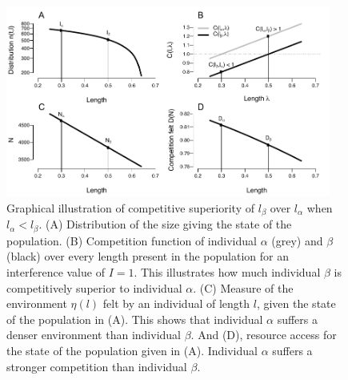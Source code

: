 \begin{figure}[!h] %
\centering
\includegraphics[width=0.95\textwidth]{4_ChapThe1/Fig/FigSM12} 
\caption[Graphical illustration of competitive superiority of $l_{\beta}$ over
$l_{\alpha}$ when $l_{\alpha}<l_{\beta}$]{
Graphical illustration of competitive superiority of $l_{\beta}$ over
$l_{\alpha}$ when $l_{\alpha}<l_{\beta}$.
(A) Distribution of the size giving the state of the population. (B) Competition
function of individual $\alpha$ (grey) and $\beta$ (black) over every length
present in the population for an interference value of $I=1$. This illustrates
how much individual $\beta$ is competitively superior to individual $\alpha$.
(C) Measure of the environment $\eta(l)$ felt by an individual of length $l$,
given the state of the population in (A). This shows that individual $\alpha$
suffers a denser environment than individual $\beta$. And (D), resource access
for the state of the population given in (A). Individual $\alpha$ suffers a
stronger competition than individual $\beta$.}
\label{Fig4-SM12}
\end{figure}